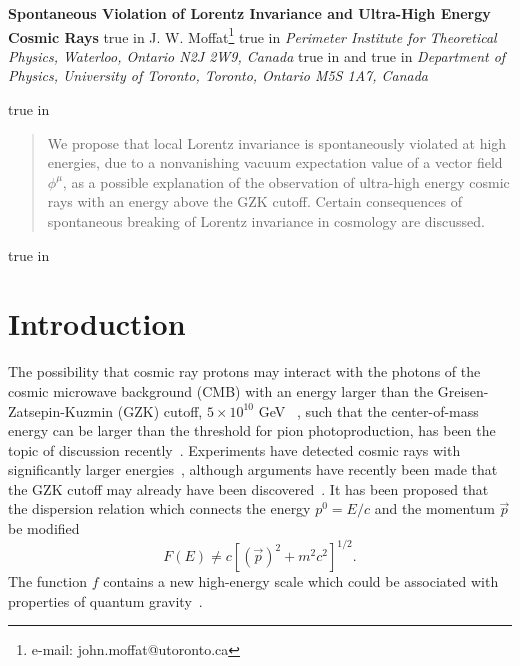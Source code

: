 \documentclass[a4paper,12pt]{article}
\begin{document}
\pagestyle{plain}
\setcounter{page}{1}
\begin{center}
{\large \textbf{Spontaneous Violation of Lorentz Invariance and
Ultra-High Energy Cosmic Rays}}
 true in
{\large J. W. Moffat}\footnote{e-mail: john.moffat@utoronto.ca}
 true in
\textit{Perimeter Institute for
Theoretical Physics, Waterloo, Ontario N2J 2W9, Canada}
 true in
and
 true in
\textit{Department of Physics, University of
Toronto, Toronto, Ontario M5S 1A7, Canada}

 true in
\begin{abstract}
We propose that local Lorentz invariance is spontaneously
violated at high energies, due to a nonvanishing vacuum expectation value of a
vector field $\phi^\mu$, as a possible explanation of the observation of ultra-high
energy cosmic rays with an energy above the GZK cutoff. Certain consequences of
spontaneous breaking of Lorentz invariance in cosmology are discussed.
\end{abstract}
 true in \end{center}

\date{\today}

\section{\bf Introduction}

The possibility that cosmic ray protons may interact with the
photons of the cosmic microwave background (CMB) with an energy
larger than the Greisen-Zatsepin-Kuzmin (GZK) cutoff, $5\times 10^{10}$ GeV
~\cite{Zatsepin}, such that the center-of-mass energy can be larger than the
threshold for pion photoproduction, has been the topic of discussion
recently~\cite{Camelia,Piran,Glashow,Camelia2,Smolin,Toller}.
Experiments have detected cosmic rays with significantly larger
energies~\cite{Takeda,Stecker}, although arguments have recently been made that the
GZK cutoff may already have been discovered~\cite{Bahcall}. It has been proposed
that the dispersion relation which connects the energy $p^0=E/c$ and the momentum
${\vec p}$ be modified
\begin{equation}
\label{dispersion}
F(E)\not= c[({\vec p})^2+m^2c^2]^{1/2}.
\end{equation}
The function $f$ contains a new high-energy scale which could be
associated with properties of quantum gravity~\cite{Camelia,Smolin,Kifune,Majid}.
\end{document}
